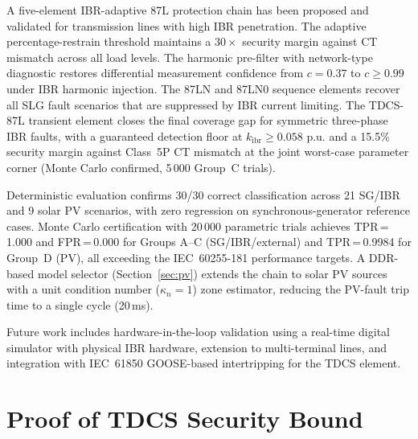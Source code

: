\documentclass[journal,twoside,10pt]{IEEEtran}
\newcommand{\kibr}{k_{\mathrm{ibr}}}
\newcommand{\kn}{\kappa_n}
\newcommand{\pu}{\,\text{p.u.}}
\begin{document}
A five-element IBR-adaptive 87L protection chain has been proposed and
validated for transmission lines with high IBR penetration.
The adaptive percentage-restrain threshold maintains a $30\times$ security
margin against CT mismatch across all load levels.
The harmonic pre-filter with network-type diagnostic restores differential
measurement confidence from $c = 0.37$ to $c \geq 0.99$ under IBR harmonic
injection.
The 87LN and 87LN0 sequence elements recover all SLG fault scenarios that
are suppressed by IBR current limiting.
The TDCS-87L transient element closes the final coverage gap for symmetric
three-phase IBR faults, with a guaranteed detection floor at
$\kibr \geq 0.058\,\pu$ and a 15.5\% security margin against Class~5P
CT mismatch at the joint worst-case parameter corner
(Monte Carlo confirmed, 5\,000 Group~C trials).

Deterministic evaluation confirms 30/30 correct classification across 21
SG/IBR and 9 solar PV scenarios, with zero regression on synchronous-generator
reference cases.
Monte Carlo certification with 20\,000 parametric trials achieves
TPR\,=\,1.000 and FPR\,=\,0.000 for Groups A--C (SG/IBR/external) and TPR\,=\,0.9984
for Group~D (PV), all exceeding the IEC~60255-181 performance targets.
A DDR-based model selector (Section~\ref{sec:pv}) extends the chain to
solar PV sources with a unit condition number ($\kn=1$) zone estimator,
reducing the PV-fault trip time to a single cycle (20\,ms).

Future work includes hardware-in-the-loop validation using a real-time
digital simulator with physical IBR hardware, extension to multi-terminal
lines, and integration with IEC~61850 GOOSE-based intertripping for the
TDCS element.

\appendix
\section{Proof of TDCS Security Bound}
\label{app:tdcs}
\end{document}
